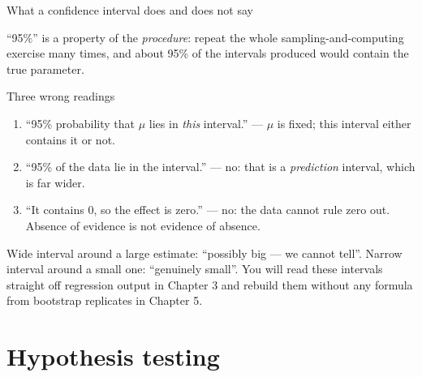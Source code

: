 \documentclass[aspectratio=169,11pt]{beamer}
\begin{document}
\begin{frame}{What a confidence interval does and does not say}
  \footnotesize
  \begin{readme}
    ``95\%'' is a property of the \emph{procedure}: repeat the whole
    sampling-and-computing exercise many times, and about 95\% of the
    intervals produced would contain the true parameter.
  \end{readme}
  \begin{alertblock}{Three wrong readings}
    \begin{enumerate}
      \item ``95\% probability that $\mu$ lies in \emph{this} interval.'' ---
            $\mu$ is fixed; this interval either contains it or not.
      \item ``95\% of the data lie in the interval.'' --- no: that is a
            \emph{prediction} interval, which is far wider.
      \item ``It contains 0, so the effect is zero.'' --- no: the data cannot
            rule zero out. Absence of evidence is not evidence of absence.
    \end{enumerate}
  \end{alertblock}
  \begin{takeaway}
    Wide interval around a large estimate: ``possibly big --- we cannot tell''.
    Narrow interval around a small one: ``genuinely small''. You will read
    these intervals straight off regression output in Chapter 3 and rebuild
    them without any formula from bootstrap replicates in Chapter 5.
  \end{takeaway}
\end{frame}


\section{Hypothesis testing}
\end{document}
